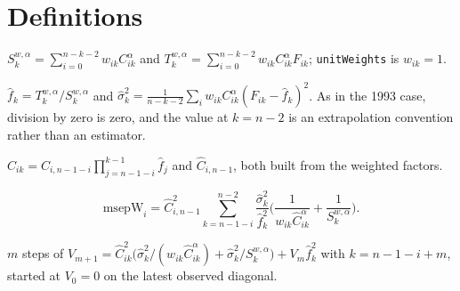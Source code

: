 \section{Definitions}

\begin{definition}\label{def:mwSums}\leanok
{}
$S_k^{w,\alpha} = \sum_{i=0}^{n-k-2} w_{ik} C_{ik}^{\alpha}$ and
$T_k^{w,\alpha} = \sum_{i=0}^{n-k-2} w_{ik} C_{ik}^{\alpha} F_{ik}$;
\texttt{unitWeights} is $w_{ik} = 1$.
\end{definition}

\begin{definition}\label{def:mwFhat}\leanok
{}
$\hat f_k = T_k^{w,\alpha}/S_k^{w,\alpha}$ and
$\hat\sigma_k^2 = \frac{1}{n-k-2}\sum_i w_{ik} C_{ik}^{\alpha}(F_{ik} - \hat f_k)^2$.
As in the 1993 case, division by zero is zero, and the value at $k = n-2$ is an
extrapolation convention rather than an estimator.
\end{definition}

\begin{definition}\label{def:mwChat}\leanok
{}
$\hat C_{ik} = C_{i,n-1-i}\prod_{j=n-1-i}^{k-1}\hat f_j$ and $\hat C_{i,n-1}$, both built from
the weighted factors.
\end{definition}

\begin{definition}\label{def:msepW}\leanok
{}
\[
  \mathrm{msepW}_i
   = \hat C_{i,n-1}^2 \sum_{k=n-1-i}^{n-2} \frac{\hat\sigma_k^2}{\hat f_k^2}
     \Big( \frac{1}{w_{ik}\hat C_{ik}^{\alpha}} + \frac{1}{S_k^{w,\alpha}} \Big).
\]
\end{definition}

\begin{definition}\label{def:mwRec}\leanok
{}
$m$ steps of
$V_{m+1} = \hat C_{ik}^2\big(\hat\sigma_k^2/(w_{ik}\hat C_{ik}^{\alpha}) + \hat\sigma_k^2/S_k^{w,\alpha}\big) + V_m \hat f_k^2$
with $k = n-1-i+m$, started at $V_0 = 0$ on the latest observed diagonal.
\end{definition}

